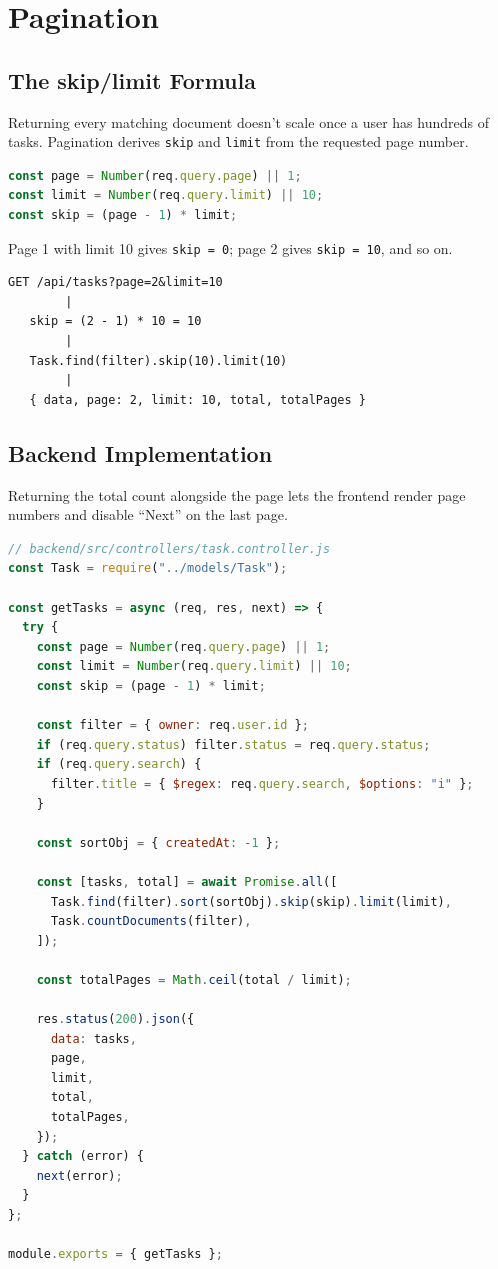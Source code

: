 \chapter{Pagination}

\section{The skip/limit Formula}

Returning every matching document doesn't scale once a user has hundreds of
tasks. Pagination derives \texttt{skip} and \texttt{limit} from the
requested page number.

\begin{lstlisting}[language=JavaScript]
const page = Number(req.query.page) || 1;
const limit = Number(req.query.limit) || 10;
const skip = (page - 1) * limit;
\end{lstlisting}

Page 1 with limit 10 gives \texttt{skip = 0}; page 2 gives \texttt{skip = 10},
and so on.

\begin{diagrambox}
\begin{verbatim}
GET /api/tasks?page=2&limit=10
        |
   skip = (2 - 1) * 10 = 10
        |
   Task.find(filter).skip(10).limit(10)
        |
   { data, page: 2, limit: 10, total, totalPages }
\end{verbatim}
\end{diagrambox}

\section{Backend Implementation}

Returning the total count alongside the page lets the frontend render page
numbers and disable ``Next'' on the last page.

\begin{lstlisting}[language=JavaScript]
// backend/src/controllers/task.controller.js
const Task = require("../models/Task");

const getTasks = async (req, res, next) => {
  try {
    const page = Number(req.query.page) || 1;
    const limit = Number(req.query.limit) || 10;
    const skip = (page - 1) * limit;

    const filter = { owner: req.user.id };
    if (req.query.status) filter.status = req.query.status;
    if (req.query.search) {
      filter.title = { $regex: req.query.search, $options: "i" };
    }

    const sortObj = { createdAt: -1 };

    const [tasks, total] = await Promise.all([
      Task.find(filter).sort(sortObj).skip(skip).limit(limit),
      Task.countDocuments(filter),
    ]);

    const totalPages = Math.ceil(total / limit);

    res.status(200).json({
      data: tasks,
      page,
      limit,
      total,
      totalPages,
    });
  } catch (error) {
    next(error);
  }
};

module.exports = { getTasks };
\end{lstlisting}


